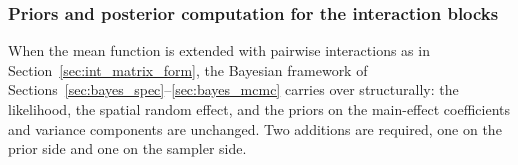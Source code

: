 %
%

\subsubsection{Priors and posterior computation for the interaction blocks}%
\label{sec:bayes_int_prior}

When the mean function is extended with pairwise interactions as in
Section~\ref{sec:int_matrix_form}, the Bayesian framework of
Sections~\ref{sec:bayes_spec}--\ref{sec:bayes_mcmc} carries over structurally: the
likelihood, the spatial random effect, and the priors on the main-effect coefficients and
variance components are unchanged. Two additions are required, one on the prior side and
one on the sampler side.

